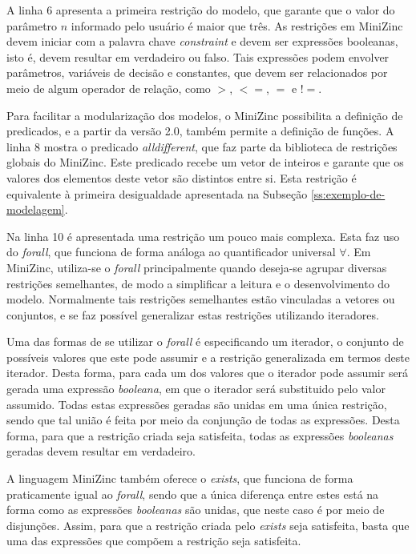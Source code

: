 A linha 6 apresenta a primeira restrição do modelo, que garante que o valor do parâmetro $n$ informado pelo usuário é maior que três. As restrições em MiniZinc devem iniciar com a palavra chave \textit{constraint} e devem ser expressões booleanas, isto é, devem resultar em verdadeiro ou falso. Tais expressões podem envolver parâmetros, variáveis de decisão e constantes, que devem ser relacionados por meio de algum operador de relação, como $>$, $<=$, $=$ e $!=$.

Para facilitar a modularização dos modelos, o MiniZinc possibilita a definição de predicados, e a partir da versão 2.0, também permite a definição de funções. A linha 8 mostra o predicado \textit{alldifferent}, que faz parte da biblioteca de restrições globais do MiniZinc. Este predicado recebe um vetor de inteiros e garante que os valores dos elementos deste vetor são distintos entre si. Esta restrição é equivalente à primeira desigualdade apresentada na Subseção \ref{ss:exemplo-de-modelagem}.

Na linha 10 é apresentada uma restrição um pouco mais complexa. Esta faz uso do \textit{forall}, que funciona de forma análoga ao quantificador universal $\forall$. Em MiniZinc, utiliza-se o \textit{forall} principalmente quando deseja-se agrupar diversas restrições semelhantes, de modo a simplificar a leitura e o desenvolvimento do modelo. Normalmente tais restrições semelhantes estão vinculadas a vetores ou conjuntos, e se faz possível generalizar estas restrições utilizando iteradores.

Uma das formas de se utilizar o \textit{forall} é especificando um iterador, o conjunto de possíveis valores que este pode assumir e a restrição generalizada em termos deste iterador. Desta forma, para cada um dos valores que o iterador pode assumir será gerada uma expressão \textit{booleana}, em que o iterador será substituido pelo valor assumido. Todas estas expressões geradas são unidas em uma única restrição, sendo que tal união é feita por meio da conjunção de todas as expressões. Desta forma, para que a restrição criada seja satisfeita, todas as expressões \textit{booleanas} geradas devem resultar em verdadeiro.

A linguagem MiniZinc também oferece o \textit{exists}, que funciona de forma praticamente igual ao \textit{forall}, sendo que a única diferença entre estes está na forma como as expressões \textit{booleanas} são unidas, que neste caso é por meio de disjunções. Assim, para que a restrição criada pelo \textit{exists} seja satisfeita, basta que uma das expressões que compõem a restrição seja satisfeita.

